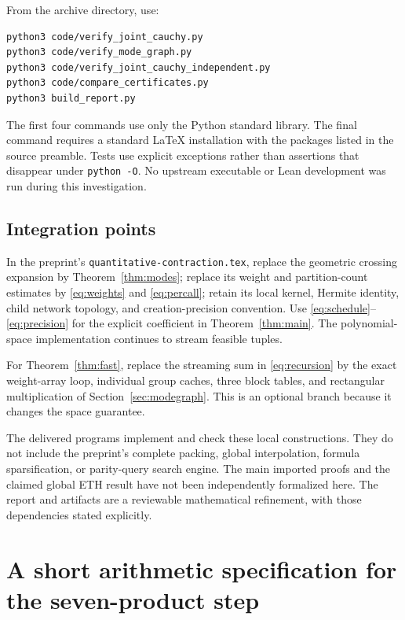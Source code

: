 \documentclass[11pt,letterpaper]{article}
\theoremstyle{definition}\newtheorem{definition}[theorem]{Definition}
\theoremstyle{remark}\newtheorem{remark}[theorem]{Remark}
\begin{document}
\noindent\begin{minipage}{\textwidth}
From the archive directory, use:
\begin{verbatim}
python3 code/verify_joint_cauchy.py
python3 code/verify_mode_graph.py
python3 code/verify_joint_cauchy_independent.py
python3 code/compare_certificates.py
python3 build_report.py
\end{verbatim}
\end{minipage}
The first four commands use only the Python standard library. The final
command requires a standard LaTeX installation with the packages listed in
the source preamble. Tests use explicit exceptions rather than assertions
that disappear under \texttt{python -O}. No upstream executable or Lean
development was run during this investigation.

\subsection{Integration points}

In the preprint's \texttt{quantitative-contraction.tex}, replace the
geometric crossing expansion by Theorem~\ref{thm:modes}; replace its
weight and partition-count estimates by \eqref{eq:weights} and
\eqref{eq:percall}; retain its local kernel, Hermite identity, child network
topology, and creation-precision convention. Use
\eqref{eq:schedule}--\eqref{eq:precision} for the explicit coefficient
in Theorem~\ref{thm:main}. The polynomial-space implementation continues
to stream feasible tuples.

For Theorem~\ref{thm:fast}, replace the streaming sum in
\eqref{eq:recursion} by the exact weight-array loop, individual group
caches, three block tables, and rectangular multiplication of
Section~\ref{sec:modegraph}. This is an optional branch because it changes
the space guarantee.

The delivered programs implement and check these local constructions.
They do not include the preprint's complete packing, global interpolation,
formula sparsification, or parity-query search engine. The main imported
proofs and the claimed global ETH result have not been independently
formalized here. The report and artifacts are a reviewable mathematical
refinement, with those dependencies stated explicitly.

\appendix
\section{A short arithmetic specification for the seven-product step}
\label{app:strassen}
\end{document}
